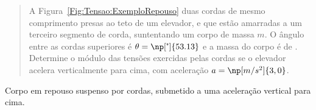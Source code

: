 \begin{quote}
    A Figura~\ref{Fig:Tensao:ExemploRepouso} duas cordas de mesmo comprimento presas ao teto de um elevador, e que estão amarradas a um terceiro segmento de corda, suntentando um corpo de massa $m$. O ângulo entre as cordas superiores é $\theta = \np[\tcdegree]{53.13}$ e a massa do corpo é de . Determine o módulo das tensões exercidas pelas cordas se o elevador acelera verticalmente para cima, com aceleração $a = \np[m/s^2]{3,0}$.
\end{quote}

\begin{marginfigure}
\centering
{}
\caption{Corpo em repouso suspenso por cordas, submetido a uma aceleração vertical para cima.\label{Fig:Tensao:ExemploAcelerado}}
\end{marginfigure}

